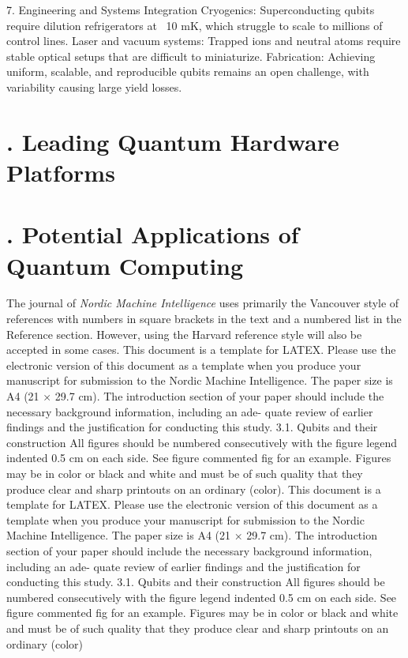 \documentclass{elbioimp2}
\begin{document}
7. Engineering and Systems Integration
Cryogenics: Superconducting qubits require dilution refrigerators at ~10 mK, which struggle to scale to millions of control lines.
Laser and vacuum systems: Trapped ions and neutral atoms require stable optical setups that are difficult to miniaturize.
Fabrication: Achieving uniform, scalable, and reproducible qubits remains an open challenge, with variability causing large yield losses.

\section{. Leading Quantum Hardware Platforms}


\section{. Potential Applications of Quantum Computing}
The journal of \emph{Nordic Machine Intelligence} uses primarily the Vancouver
style of references with numbers in square brackets in the text and a
numbered list in the Reference section.\cite{biomed-req} However, using the
Harvard reference style will also be accepted in some cases.
This document is a template for LATEX. Please use
the electronic version of this document as a template
when you produce your manuscript for submission to the
Nordic Machine Intelligence. The paper size is A4 (21 ×
29.7 cm).
The introduction section of your paper should include
the necessary background information, including an ade-
quate review of earlier findings and the justification for
conducting this study.
3.1. Qubits and their construction
All figures should be numbered consecutively with the
figure legend indented 0.5 cm on each side. See figure
commented fig for an example. Figures may be in color
or black and white and must be of such quality that they
produce clear and sharp printouts on an ordinary (color).
This document is a template for LATEX. Please use
the electronic version of this document as a template
when you produce your manuscript for submission to the
Nordic Machine Intelligence. The paper size is A4 (21 ×
29.7 cm).
The introduction section of your paper should include
the necessary background information, including an ade-
quate review of earlier findings and the justification for
conducting this study.
3.1. Qubits and their construction
All figures should be numbered consecutively with the
figure legend indented 0.5 cm on each side. See figure
commented fig for an example. Figures may be in color
or black and white and must be of such quality that they
produce clear and sharp printouts on an ordinary (color)
\end{document}
